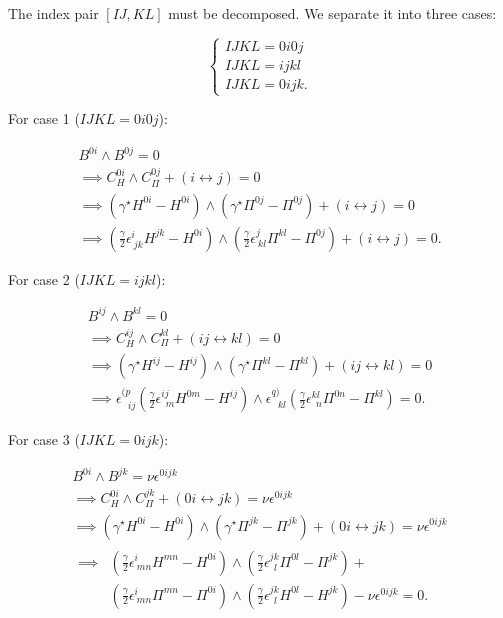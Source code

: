 \documentclass{article}
\begin{document}
The index pair $[IJ, KL]$ must be decomposed. We separate it into three cases:

$$
\begin{cases}
IJKL = 0i0j\\
IJKL = ijkl\\
IJKL = 0ijk.
\end{cases}
$$

For case 1 ($IJKL = 0i0j$):

$$
\begin{gathered}
B^{0i} \wedge B^{0j} = 0 \\
\implies C^{0i}_H \wedge C^{0j}_\Pi + (i \leftrightarrow j) = 0 \\
\implies (\gamma ^\star H^{0i} - H^{0i}) \wedge (\gamma ^\star \Pi^{0j} - \Pi^{0j}) + (i \leftrightarrow j) = 0 \\
\implies \left(\frac{\gamma}{2}\epsilon^i_{\ jk}H^{jk} - H^{0i}\right) \wedge \left(\frac{\gamma}{2}\epsilon^j_{\ kl}\Pi^{kl} - \Pi^{0j}\right) + (i \leftrightarrow j) = 0.
\end{gathered}
$$

For case 2 ($IJKL = ijkl$):

$$
\begin{gathered}
B^{ij} \wedge B^{kl} = 0 \\
\implies C^{ij}_H \wedge C^{kl}_\Pi + (ij \leftrightarrow kl) = 0 \\
\implies (\gamma ^\star H^{ij} - H^{ij}) \wedge (\gamma ^\star \Pi^{kl} - \Pi^{kl}) + (ij \leftrightarrow kl) = 0 \\
\implies \epsilon^{(p}_{\ \ \  ij}\left(\frac{\gamma}{2}\epsilon^{ij}_{\ \ m} H^{0m} - H^{ij}\right) \wedge \epsilon^{q)}_{\ \ \ kl}\left(\frac{\gamma}{2}\epsilon^{kl}_{\ \ n} \Pi^{0n} - \Pi^{kl}\right) = 0.
\end{gathered}
$$

For case 3 ($IJKL = 0ijk$):

$$
\begin{gathered}
B^{0i} \wedge B^{jk} = \nu \epsilon^{0ijk} \\
\implies C^{0i}_H \wedge C^{jk}_\Pi + (0i \leftrightarrow jk) = \nu \epsilon^{0ijk} \\
\implies (\gamma ^\star H^{0i} - H^{0i}) \wedge (\gamma ^\star \Pi^{jk} - \Pi^{jk}) + (0i \leftrightarrow jk) = \nu \epsilon^{0ijk} \\
\begin{aligned}
\implies &\left(\frac{\gamma}{2}\epsilon^i_{\ mn} H^{mn} - H^{0i}\right) \wedge \left(\frac{\gamma}{2}\epsilon^{jk}_{\ \ l} \Pi^{0l} - \Pi^{jk}\right) +\\
&\left(\frac{\gamma}{2}\epsilon^i_{\ mn}\Pi^{mn} - \Pi^{0i}\right) \wedge \left(\frac{\gamma}{2}\epsilon^{jk}_{\ \ l}H^{0l} - H^{jk}\right) - \nu \epsilon^{0ijk}= 0.
\end{aligned}
\end{gathered}
$$
\end{document}
